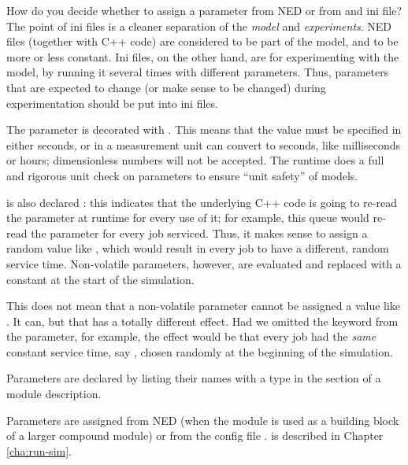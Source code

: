 \begin{note}
    How do you decide whether to assign a parameter from NED or from and ini
    file? The point of ini files is a cleaner separation of the \textit{model}
    and \textit{experiments}. NED files (together with C++ code) are considered
    to be part of the model, and to be more or less constant. Ini files, on
    the other hand, are for experimenting with the model, by running it
    several times with different parameters. Thus, parameters that are expected
    to change (or make sense to be changed) during experimentation should be
    put into ini files.
\end{note}

The  parameter is decorated with . This means
that the value must be specified in either seconds, or in a measurement unit {\opp}
can convert to seconds, like milliseconds or hours; dimensionless numbers
will not be accepted. The {\opp} runtime does a full and rigorous unit check on
parameters to ensure ``unit safety'' of models.

 is also declared : this indicates that the
underlying C++ code is going to re-read the parameter at runtime for every
use of it; for example, this queue would re-read the parameter for every job
serviced. Thus, it makes sense to assign  a random value like
, which would result in every job to have a different,
random service time. Non-volatile parameters, however, are evaluated and
replaced with a constant at the start of the simulation.

\begin{note}
    This does not mean that a non-volatile parameter cannot be assigned a value
    like . It can, but that has a totally different
    effect. Had we omitted the  keyword from the
     parameter, for example, the effect would be that every
    job had the \textit{same} constant service time, say ,
    chosen randomly at the beginning of the simulation.
\end{note}

Parameters are declared by listing their names with a type in the
 section of a module description.

Parameters are assigned from NED (when the module is used as a building block
of a larger compound module) or from the config file .
 is described in Chapter \ref{cha:run-sim}.

